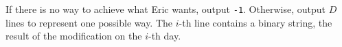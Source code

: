 If there is no way to achieve what Eric wants, output \verb+-1+.
Otherwise, output $D$ lines to represent one possible way. 
The $i$-th line contains a binary string, the result of the 
modification on the $i$-th day.
